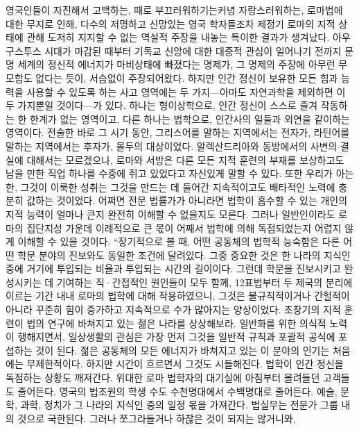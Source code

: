 영국인들이 자진해서 고백하는,
때로 부끄러워하기는커녕 자랑스러워하는,
로마법에 대한 무지로 인해,
다수의 저명하고 신망있는 영국 학자들조차
제정기 로마의 지적 상태에 관해 도저히 지지할 수 없는
역설적 주장을 내놓는 특이한 결과가 생겨났다.
아우구스투스 시대가 마감된 때부터
기독교 신앙에 대한 대중적 관심이 일어나기 전까지
문명 세계의 정신적 에너지가 마비상태에 빠졌다는 명제가,
그 명제의 주장에 아무런 무모함도 없다는 듯이,
서슴없이
주장되어왔다.
하지만
인간 정신이 보유한 모든 힘과 능력을 사용할 수 있도록 하는
사고 영역에는 두 가지---아마도 자연과학을 제외하면
이 두 가지뿐일 것이다---가 있다.
하나는 형이상학으로,
인간 정신이 스스로 즐겨 작동하는 한 한계가 없는 영역이고,
다른 하나는 법학으로,
인간사의 일들과 외연을 같이하는 영역이다.
전술한 바로 그 시기 동안,
그리스어를 말하는 지역에서는 전자가,
라틴어를 말하는 지역에서는 후자가,
몰두의 대상이었다.
알렉산드리아와 동방에서의 사변의 결실에 대해서는 모르겠으나,
로마와 서방은
다른 모든 지적 훈련의 부재를 보상하고도 남을 만한
직업 하나를 수중에 쥐고 있었다고
자신있게 말할 수 있다.
또한 우리가 아는 한,
그것이 이룩한 성취는
그것을 만드는 데 들어간 지속적이고도 배타적인 노력에
충분히
값하는 것이었다.
어쩌면
전문 법률가가 아니라면
법학이 흡수할 수 있는 개인의 지적 능력이 얼마나 큰지
완전히 이해할 수 없을지도 모른다.
그러나 일반인이라도
로마의 집단지성 가운데 이례적으로 큰 몫이
어째서 법학에 의해
독점되었는지
어렵지 않게 이해할 수 있을 것이다.
``장기적으로 볼 때,
어떤 공동체의
법학적 능숙함은
다른 어떤 학문 분야의 진보와도 동일한 조건에 달려있다.
그중 중요한 것은 한 나라의 지식인 중에 거기에 투입되는 비율과
투입되는 시간의 길이이다.
그런데
학문을 진보시키고 완성시키는 데 기여하는
직^^b7간접적인 원인들이 모두 함께,
12표법부터 두 제국의 분리에 이르는 기간 내내
로마의 법학에 대해 작용하였으니,
그것은 불규칙적이거나 간헐적이 아니라
꾸준히 힘이 증가하고 지속적으로 수가 많아지는 양상이었다.
초창기의 지적 훈련이 법의 연구에 바쳐지고 있는 젊은 나라를 상상해보라.
일반화를 위한 의식적 노력이 행해지면서,
일상생활의 관심은 가장 먼저
그것을 일반적 규칙과 포괄적 공식에 포섭하는 것이 된다.
젊은 공동체의 모든 에너지가 바쳐지고 있는 이 분야의 인기는
처음에는 무제한적이다.
하지만 시간이 흐르면서 그것도 시들해진다.
법학이 인간 정신을 독점하는 상황도 깨져간다.
위대한 로마 법학자의 대기실에 아침부터 몰려들던 고객들도 줄어든다.
영국의 법조원의 학생 수도
수천명대에서 수백명대로 줄어든다.
예술, 문학, 과학, 정치가 그 나라의 지식인 중의 일정 몫을 가져간다.
법실무는 전문가 그룹 내의 것으로 국한된다.
그러나 쪼그라들거나 하찮은 것이 되지는 않거니와,
